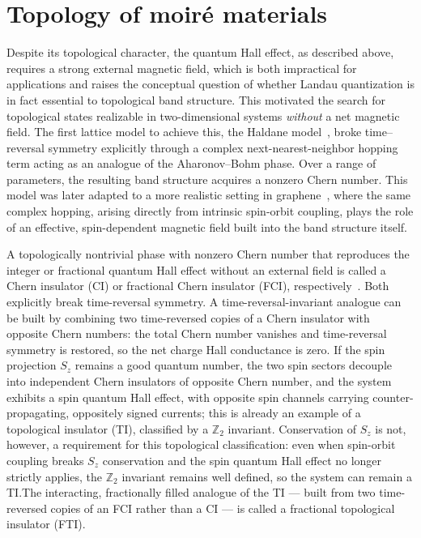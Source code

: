 \section{Topology of moir\'e materials}\label{sec:moire_topology}
Despite its topological character, the quantum Hall effect, as described above, requires a strong external magnetic field, which is both impractical for applications and raises the conceptual question of whether Landau quantization is in fact essential to topological band structure. This motivated the search for topological states realizable in two-dimensional systems \emph{without} a net magnetic field. The first lattice model to achieve this, the Haldane model~\cite{PhysRevLett.61.2015}, broke time--reversal symmetry explicitly through a complex next-nearest-neighbor hopping term acting as an analogue of the Aharonov--Bohm phase. Over a range of parameters, the resulting band structure acquires a nonzero Chern number. This model was later adapted to a more realistic setting in graphene~\cite{PhysRevLett.95.226801}, where the same complex hopping, arising directly from intrinsic spin-orbit coupling, plays the role of an effective, spin-dependent magnetic field built into the band structure itself. %

A topologically nontrivial phase with nonzero Chern number that reproduces the integer or fractional quantum Hall effect without an external field is called a Chern insulator (CI) or fractional Chern insulator (FCI), respectively~\cite{neupert2011fractional, regnault2011fractional, Sheng2011}. Both explicitly break time-reversal symmetry. A time-reversal-invariant analogue can be built by combining two time-reversed copies of a Chern insulator with opposite Chern numbers: the total Chern number vanishes and time-reversal symmetry is restored, so the net charge Hall conductance is zero. If the spin projection $S_z$ remains a good quantum number, the two spin sectors decouple into independent Chern insulators of opposite Chern number, and the system exhibits a spin quantum Hall effect, with opposite spin channels carrying counter-propagating, oppositely signed currents; this is already an example of a topological insulator (TI), classified by a $\mathbb{Z}_2$ invariant. Conservation of $S_z$ is not, however, a requirement for this topological classification: even when spin-orbit coupling breaks $S_z$ conservation and the spin quantum Hall effect no longer strictly applies, the $\mathbb{Z}_2$ invariant remains well defined, so the system can remain a TI.\@ The interacting, fractionally filled analogue of the TI --- built from two time-reversed copies of an FCI rather than a CI --- is called a fractional topological insulator (FTI).

